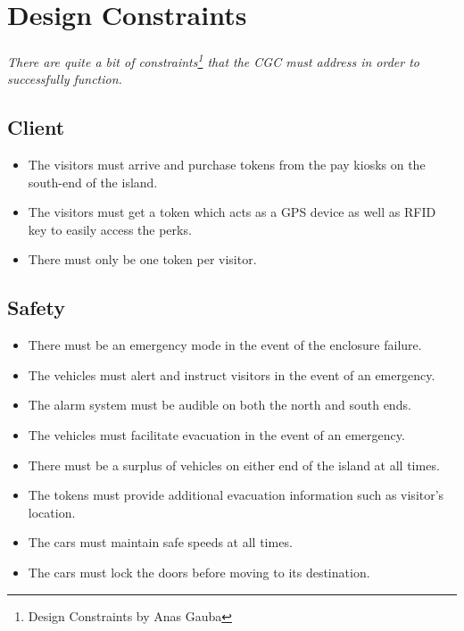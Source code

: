 \documentclass[12pt]{article}
\begin{document}
\section{Design Constraints} \label{cons} %
\paragraph{} \textit{There are quite a bit of constraints\footnote{Design Constraints by Anas Gauba} that the CGC must address in order to successfully function.}

    \subsection{Client}
    \begin{itemize}
        \item The visitors must arrive and purchase tokens from the pay kiosks on the south-end of the island. 
        \item The visitors must get a token which acts as a GPS device as well as RFID key to easily access the perks. 
        \item There must only be one token per visitor.
    \end{itemize}

    \subsection{Safety}
    \begin{itemize}
        \item There must be an emergency mode in the event of the enclosure failure.
        \item The vehicles must alert and instruct visitors in the event of an emergency.
        \item The alarm system must be audible on both the north and south ends.
        \item The vehicles must facilitate evacuation in the event of an emergency.
        \item There must be a surplus of vehicles on either end of the island at all times.
        \item The tokens must provide additional evacuation information such as visitor's location.
        \item The cars must maintain safe speeds at all times.
        \item The cars must lock the doors before moving to its destination.
    \end{itemize}
\end{document}
